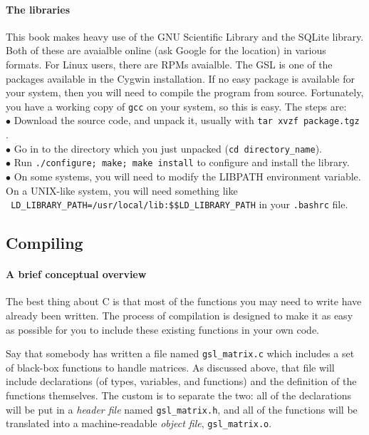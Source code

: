\documentclass[12pt]{article}
\def\ind#1{\index{#1}#1}
\begin{document}
\paragraph{The \ind{libraries}} This book makes heavy use of the GNU Scientific Library and the SQLite library.
Both of these are avaialble online (ask Google for the location) in various formats. For Linux users,
there are RPMs avaialble. The GSL is one of the packages available in the Cygwin installation. If no easy
package is available for your system, then you will need to compile the program from source. Fortunately,
you have a working copy of {\tt gcc} on your system, so this is easy. The steps are:\\
$\bullet$ Download the source code, and unpack it, usually with {\tt tar xvzf package.tgz} .\\
$\bullet$ Go in to the directory which you just unpacked ({\tt cd directory\_name}).\\
$\bullet$ Run {\tt ./configure; make; make install} to configure and install the library.\\
$\bullet$ On some systems, you will need to modify the LIBPATH environment variable. 
On a UNIX-like system, you will need something like\\ {\tt 
        LD\_LIBRARY\_PATH=/usr/local/lib:\$\$LD\_LIBRARY\_PATH} in your {\tt .bashrc} file.

\subsection{Compiling}	 

\paragraph{A brief conceptual overview} The best thing about C is that most
of the functions you may need to write have already been written. The
process of compilation is designed to make it as easy as possible for
you to include these existing functions in your own code.

Say that somebody has written a file named {\tt gsl\_matrix.c} which
includes a set of black-box functions to handle matrices.
As discussed above,
that file will include declarations (of types, variables, and functions)
and the definition of the functions themselves. The custom is to separate
the two: all of the declarations will be put in a {\sl \ind{header file}}
named {\tt gsl\_matrix.h}, and all of the functions will be translated
into a machine-readable {\sl \ind{object file}}, {\tt gsl\_matrix.o}.
\end{document}
